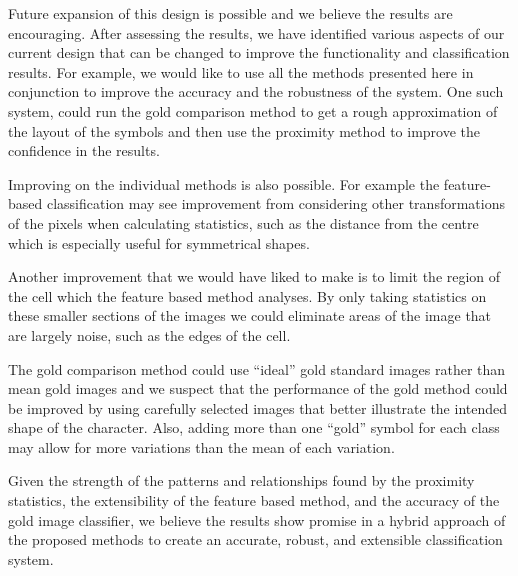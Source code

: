 
Future expansion of this design is possible and we believe the results are
encouraging.  After assessing the results, we have identified various aspects
of our current design that can be changed to improve the functionality and
classification results. For example, we would like to use all the methods
presented here in conjunction to improve the accuracy and the robustness of the
system.  One such system, could run the gold comparison method to get a rough
approximation of the layout of the symbols and then use the proximity method to
improve the confidence in the results. 

Improving on the individual methods is also possible. For example the feature-based
classification may see improvement from considering other transformations of
the pixels when calculating statistics, such as the distance from the centre
which is especially useful for symmetrical shapes. 

Another improvement that we would have liked to make is to limit the
region of the cell which the feature based method analyses.  By only taking
statistics on these smaller sections of the images we could eliminate areas of
the image that are largely noise, such as the edges of the cell.

The gold comparison method could use ``ideal'' gold standard images rather than mean
gold images and we suspect that the performance of the gold method could be
improved by using carefully selected images that better illustrate the intended
shape of the character. Also, adding more than one ``gold'' symbol for each
class may allow for more variations than the mean of each variation.

Given the strength of the patterns and relationships found by the proximity
statistics, the extensibility of the feature based method, and the accuracy of
the gold image classifier, we believe the results show promise in a hybrid
approach of the proposed methods to create an accurate, robust, and extensible
classification system.

